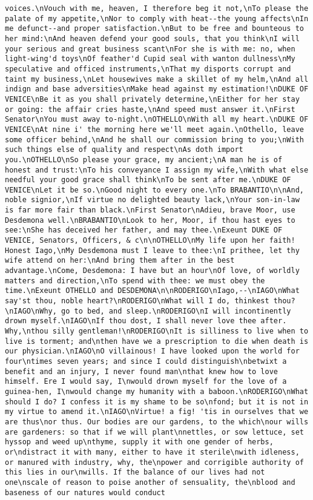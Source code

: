 \begin{verbatim}
voices.\nVouch with me, heaven, I therefore beg it not,\nTo please the palate of my appetite,\nNor to comply with heat--the young affects\nIn me defunct--and proper satisfaction.\nBut to be free and bounteous to her mind:\nAnd heaven defend your good souls, that you think\nI will your serious and great business scant\nFor she is with me: no, when light-wing'd toys\nOf feather'd Cupid seal with wanton dullness\nMy speculative and officed instruments,\nThat my disports corrupt and taint my business,\nLet housewives make a skillet of my helm,\nAnd all indign and base adversities\nMake head against my estimation!\nDUKE OF VENICE\nBe it as you shall privately determine,\nEither for her stay or going: the affair cries haste,\nAnd speed must answer it.\nFirst Senator\nYou must away to-night.\nOTHELLO\nWith all my heart.\nDUKE OF VENICE\nAt nine i' the morning here we'll meet again.\nOthello, leave some officer behind,\nAnd he shall our commission bring to you;\nWith such things else of quality and respect\nAs doth import you.\nOTHELLO\nSo please your grace, my ancient;\nA man he is of honest and trust:\nTo his conveyance I assign my wife,\nWith what else needful your good grace shall think\nTo be sent after me.\nDUKE OF VENICE\nLet it be so.\nGood night to every one.\nTo BRABANTIO\n\nAnd, noble signior,\nIf virtue no delighted beauty lack,\nYour son-in-law is far more fair than black.\nFirst Senator\nAdieu, brave Moor, use Desdemona well.\nBRABANTIO\nLook to her, Moor, if thou hast eyes to see:\nShe has deceived her father, and may thee.\nExeunt DUKE OF VENICE, Senators, Officers, & c\n\nOTHELLO\nMy life upon her faith! Honest Iago,\nMy Desdemona must I leave to thee:\nI prithee, let thy wife attend on her:\nAnd bring them after in the best advantage.\nCome, Desdemona: I have but an hour\nOf love, of worldly matters and direction,\nTo spend with thee: we must obey the time.\nExeunt OTHELLO and DESDEMONA\n\nRODERIGO\nIago,--\nIAGO\nWhat say'st thou, noble heart?\nRODERIGO\nWhat will I do, thinkest thou?\nIAGO\nWhy, go to bed, and sleep.\nRODERIGO\nI will incontinently drown myself.\nIAGO\nIf thou dost, I shall never love thee after. Why,\nthou silly gentleman!\nRODERIGO\nIt is silliness to live when to live is torment; and\nthen have we a prescription to die when death is our physician.\nIAGO\nO villainous! I have looked upon the world for four\ntimes seven years; and since I could distinguish\nbetwixt a benefit and an injury, I never found man\nthat knew how to love himself. Ere I would say, I\nwould drown myself for the love of a guinea-hen, I\nwould change my humanity with a baboon.\nRODERIGO\nWhat should I do? I confess it is my shame to be so\nfond; but it is not in my virtue to amend it.\nIAGO\nVirtue! a fig! 'tis in ourselves that we are thus\nor thus. Our bodies are our gardens, to the which\nour wills are gardeners: so that if we will plant\nnettles, or sow lettuce, set hyssop and weed up\nthyme, supply it with one gender of herbs, or\ndistract it with many, either to have it sterile\nwith idleness, or manured with industry, why, the\npower and corrigible authority of this lies in our\nwills. If the balance of our lives had not one\nscale of reason to poise another of sensuality, the\nblood and baseness of our natures would conduct 
\end{verbatim}
